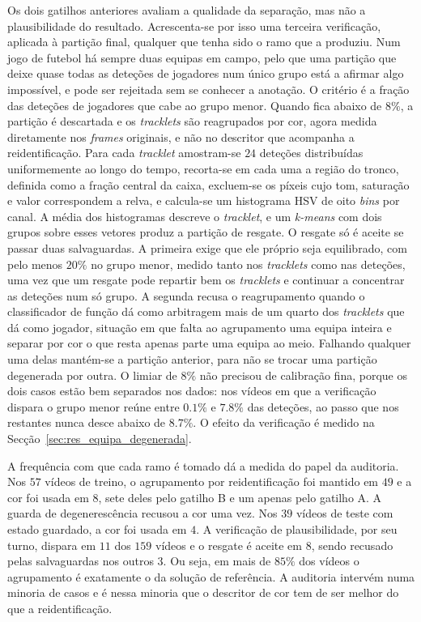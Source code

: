 Os dois gatilhos anteriores avaliam a qualidade da separação, mas não a plausibilidade do resultado.
Acrescenta-se por isso uma terceira verificação, aplicada à partição final, qualquer que tenha sido o
ramo que a produziu. Num jogo de futebol há sempre duas equipas em campo, pelo que uma partição que
deixe quase todas as deteções de jogadores num único grupo está a afirmar algo impossível, e pode ser
rejeitada sem se conhecer a anotação. O critério é a fração das deteções de jogadores que cabe ao
grupo menor. Quando fica abaixo de $8\%$, a partição é descartada e os \emph{tracklets} são
reagrupados por cor, agora medida diretamente nos \emph{frames} originais, e não no descritor que
acompanha a reidentificação. Para cada \emph{tracklet} amostram-se $24$ deteções distribuídas
uniformemente ao longo do tempo, recorta-se em cada uma a região do tronco, definida como a fração
central da caixa, excluem-se os píxeis cujo tom, saturação e valor correspondem a relva, e calcula-se
um histograma HSV de oito \emph{bins} por canal. A média dos histogramas descreve o \emph{tracklet},
e um \emph{k-means} com dois grupos sobre esses vetores produz a partição de resgate. O resgate só é
aceite se passar duas salvaguardas. A primeira exige que ele próprio seja equilibrado, com pelo menos
$20\%$ no grupo menor, medido tanto nos \emph{tracklets} como nas deteções, uma vez que um resgate
pode repartir bem os \emph{tracklets} e continuar a concentrar as deteções num só grupo. A segunda
recusa o reagrupamento quando o classificador de função dá como arbitragem mais de um quarto dos
\emph{tracklets} que dá como jogador, situação em que falta ao agrupamento uma equipa inteira e
separar por cor o que resta apenas parte uma equipa ao meio. Falhando qualquer uma delas mantém-se a
partição anterior, para não se trocar uma partição degenerada por outra. O
limiar de $8\%$ não precisou de calibração fina, porque os dois casos estão bem separados nos dados:
nos vídeos em que a verificação dispara o grupo menor reúne entre $0.1\%$ e $7.8\%$ das deteções, ao
passo que nos restantes nunca desce abaixo de $8.7\%$. O efeito da verificação é medido na
Secção~\ref{sec:res_equipa_degenerada}.

A frequência com que cada ramo é tomado dá a medida do papel da auditoria. Nos $57$ vídeos de
treino, o agrupamento por reidentificação foi mantido em $49$ e a cor foi usada em $8$, sete deles
pelo gatilho B e um apenas pelo gatilho A. A guarda de degenerescência recusou a cor uma vez. Nos
$39$ vídeos de teste com estado guardado, a cor foi usada em $4$. A verificação de plausibilidade,
por seu turno, dispara em $11$ dos $159$ vídeos e o resgate é aceite em $8$, sendo recusado pelas
salvaguardas nos outros $3$. Ou seja, em mais de
$85\%$ dos vídeos o agrupamento é exatamente o da solução de referência. A auditoria intervém numa minoria de
casos e é nessa minoria que o descritor de cor tem de ser melhor do que a reidentificação.

